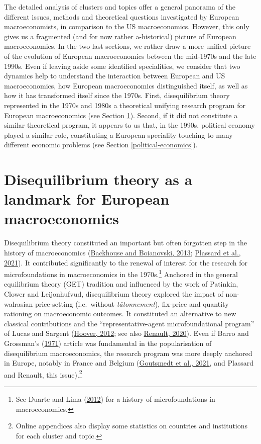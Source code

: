 \documentclass[
]{article}
\begin{document}
The detailed analysis of clusters and topics offer a general panorama of
the different issues, methods and theoretical questions investigated by
European macroeconomists, in comparison to the US macroeconomics.
However, this only gives us a fragmented (and for now rather
a-historical) picture of European macroeconomics. In the two last
sections, we rather draw a more unified picture of the evolution of
European macroeconomics between the mid-1970s and the late 1990s. Even
if leaving aside some identified specialities, we consider that two
dynamics help to understand the interaction between European and US
macroeconomics, how European macroeconomics distinguished itself, as
well as how it has transformed itself since the 1970s. First,
disequilibrium theory represented in the 1970s and 1980s a theoretical
unifying research program for European macroeconomics (see Section
\ref{disequilibrium}). Second, if it did not constitute a similar
theoretical program, it appears to us that, in the 1990s, political
economy played a similar role, constituting a European speciality
touching to many different economic problems (see Section
\ref{political-economics}).

\hypertarget{disequilibrium}{%
\section{Disequilibrium theory as a landmark for European
macroeconomics}\label{disequilibrium}}

Disequilibrium theory constituted an important but often forgotten step
in the history of macroeconomics
(\protect\hyperlink{ref-backhouseboianovski2013}{Backhouse and
Boianovski, 2013}; \protect\hyperlink{ref-plassard2021}{Plassard et al.,
2021}). It contributed significantly to the renewal of interest for the
research for microfoundations in macroeconomics in the 1970s.\footnote{See
  Duarte and Lima (\protect\hyperlink{ref-duartelima2012a}{2012}) for a
  history of microfoundations in macroeconomics.} Anchored in the
general equilibrium theory (GET) tradition and influenced by the work of
Patinkin, Clower and Leijonhufvud, disequilibrium theory explored the
impact of non-walrasian price-setting (i.e.~without \emph{tâtonnement}),
fix-price and quantity rationing on macroeconomic outcomes. It
constituted an alternative to new classical contributions and the
``representative-agent microfoundational program'' of Lucas and Sargent
(\protect\hyperlink{ref-hoover2012}{Hoover, 2012}; see also
\protect\hyperlink{ref-renault2020a}{Renault, 2020}). Even if Barro and
Grossman's (\protect\hyperlink{ref-barro1971}{1971}) article was
fundamental in the popularisation of disequilibrium macroeconomics, the
research program was more deeply anchored in Europe, notably in France
and Belgium (\protect\hyperlink{ref-goutsmedt2021}{Goutsmedt et al.,
2021}, and Plassard and Renault, this issue).\footnote{Online appendices
  also display some statistics on countries and institutions for each
  cluster and topic.}
\end{document}
